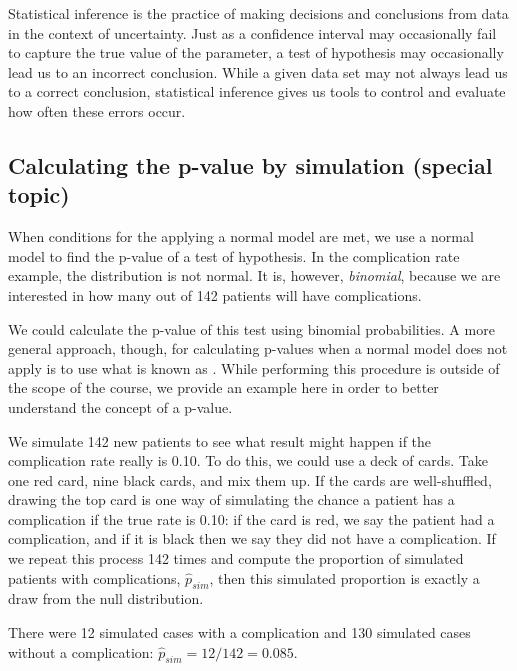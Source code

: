 Statistical inference is the practice of making decisions and conclusions from data in the context of uncertainty. Just as a confidence interval may occasionally fail to capture the true value of the parameter, a test of hypothesis may occasionally lead us to an incorrect conclusion. While a given data set may not always lead us to a correct conclusion, statistical inference gives us tools to control and evaluate how often these errors occur.


\D{\newpage}

\subsection{Calculating the p-value by simulation (special topic)}
\label{calcPValueUsingSimulationSubSection}

When conditions for the applying a normal model are met, we use a normal model to find the p-value of a test of hypothesis. In the complication rate example, the distribution is not normal. It is, however, \emph{binomial}, because we are interested in how many out of 142 patients will have complications.

We could calculate the p-value of this test using binomial probabilities. A more general approach, though, for calculating p-values when a normal model does not apply is to use what is known as . While performing this procedure is outside of the scope of the course, we provide an example here in order to better understand the concept of a p-value.

We simulate 142 new patients to see what result might happen if the complication rate really is 0.10. To do this, we could use a deck of cards. Take one red card, nine black cards, and mix them up. If the cards are well-shuffled, drawing the top card is one way of simulating the chance a patient has a complication if the true rate is 0.10: if the card is red, we say the patient had a complication, and if it is black then we say they did not have a complication. If we repeat this process 142 times and compute the proportion of simulated patients with complications, $\hat{p}_{sim}$, then this simulated proportion is exactly a draw from the null distribution.

There were 12 simulated cases with a complication and 130 simulated cases without a complication: $\hat{p}_{sim} = 12 / 142 = 0.085$.

